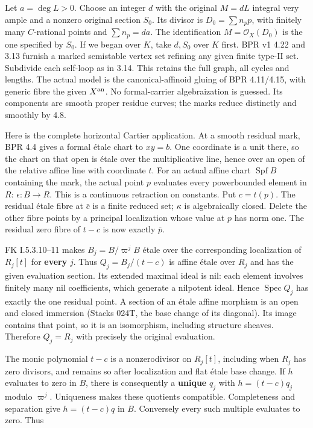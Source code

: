 \documentclass[
  11pt,
]{article}
\begin{document}
Let \(a=\deg L>0\). Choose an integer \(d\) with the original \(M=dL\)
integral very ample and a nonzero original section \(S_0\). Its divisor
is \(D_0=\sum n_pp\), with finitely many \(C\)-rational points and
\(\sum n_p=da\). The identification \(M=\mathcal O_X(D_0)\) is the one
specified by \(S_0\). If we began over \(K\), take \(d,S_0\) over \(K\)
first. BPR v1 4.22 and 3.13 furnish a marked semistable vertex set
refining any given finite type-II set. Subdivide each self-loop as in
3.14. This retains the full graph, all cycles and lengths. The actual
model is the canonical-affinoid gluing of BPR 4.11/4.15, with generic
fibre the given \(X^{\rm an}\). No formal-carrier algebraization is
guessed. Its components are smooth proper residue curves; the marks
reduce distinctly and smoothly by 4.8.

Here is the complete horizontal Cartier application. At a smooth
residual mark, BPR 4.4 gives a formal étale chart to \(xy=b\). One
coordinate is a unit there, so the chart on that open is étale over the
multiplicative line, hence over an open of the relative affine line with
coordinate \(t\). For an actual affine chart \(\operatorname{Spf}B\)
containing the mark, the actual point \(p\) evaluates every powerbounded
element in \(R\): \(\epsilon:B\to R\). This is a continuous retraction
on constants. Put \(c=t(p)\). The residual étale fibre at \(\bar c\) is
a finite reduced set; \(\kappa\) is algebraically closed. Delete the
other fibre points by a principal localization whose value at \(p\) has
norm one. The residual zero fibre of \(t-c\) is now exactly \(\bar p\).

FK I.5.3.10--11 makes \(B_j=B/\varpi^jB\) étale over the corresponding
localization of \(R_j[t]\) for \textbf{every} \(j\). Thus
\(Q_j=B_j/(t-c)\) is affine étale over \(R_j\) and has the given
evaluation section. Its extended maximal ideal is nil: each element
involves finitely many nil coefficients, which generate a nilpotent
ideal. Hence \(\operatorname{Spec}Q_j\) has exactly the one residual
point. A section of an étale affine morphism is an open and closed
immersion (Stacks 024T, the base change of its diagonal). Its image
contains that point, so it is an isomorphism, including structure
sheaves. Therefore \(Q_j=R_j\) with precisely the original evaluation.

The monic polynomial \(t-c\) is a nonzerodivisor on \(R_j[t]\),
including when \(R_j\) has zero divisors, and remains so after
localization and flat étale base change. If \(h\) evaluates to zero in
\(B\), there is consequently a \textbf{unique} \(q_j\) with
\(h=(t-c)q_j\) modulo \(\varpi^j\). Uniqueness makes these quotients
compatible. Completeness and separation give \(h=(t-c)q\) in \(B\).
Conversely every such multiple evaluates to zero. Thus
\end{document}
